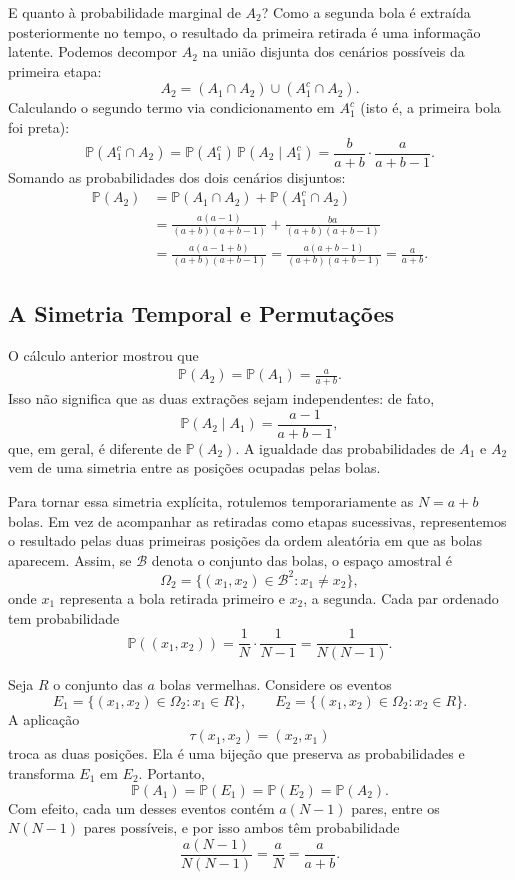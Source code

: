 \documentclass[12pt,portuguese]{article}
\theoremstyle{definition}
\begin{document}
E quanto à probabilidade marginal de \(A_2\)? Como a segunda bola é extraída posteriormente no tempo, o resultado da primeira retirada é uma informação latente. Podemos decompor \(A_2\) na união disjunta dos cenários possíveis da primeira etapa:
\[
  A_2 = (A_1 \cap A_2) \cup (A_1^c \cap A_2).
\]
Calculando o segundo termo via condicionamento em \(A_1^c\) (isto é, a primeira bola foi preta):
\[
  \mathbb{P}(A_1^c \cap A_2) = \mathbb{P}(A_1^c)\,\mathbb{P}(A_2 \mid A_1^c) = \frac{b}{a+b} \cdot \frac{a}{a+b-1}.
\]
Somando as probabilidades dos dois cenários disjuntos:
\begin{equation}\label{eq:urna-segunda-bola}
  \begin{aligned}
    \mathbb{P}(A_2) &= \mathbb{P}(A_1 \cap A_2) + \mathbb{P}(A_1^c \cap A_2) \\
    &= \frac{a(a-1)}{(a+b)(a+b-1)} + \frac{ba}{(a+b)(a+b-1)} \\
    &= \frac{a(a - 1 + b)}{(a+b)(a+b-1)} = \frac{a(a+b-1)}{(a+b)(a+b-1)} = \frac{a}{a+b}.
  \end{aligned}
\end{equation}

\subsection{A Simetria Temporal e Permutações}

O cálculo anterior mostrou que
\begin{align*}
  \mathbb{P}(A_2)=\mathbb{P}(A_1)=\frac{a}{a+b}.
\end{align*}
Isso não significa que as duas extrações sejam independentes: de fato,
\[
  \mathbb{P}(A_2\mid A_1)=\frac{a-1}{a+b-1},
\]
que, em geral, é diferente de \(\mathbb{P}(A_2)\). A igualdade das probabilidades 
de $A_1$ e $A_2$ vem de uma simetria entre as posições ocupadas pelas bolas.

Para tornar essa simetria explícita, rotulemos temporariamente as \(N=a+b\) bolas. Em vez de acompanhar as retiradas como etapas sucessivas, representemos o resultado pelas duas primeiras posições da ordem aleatória em que as bolas aparecem. Assim, se \(\mathcal{B}\) denota o conjunto das bolas, o espaço amostral é
\[
  \Omega_2=\{(x_1,x_2)\in\mathcal{B}^2:x_1\neq x_2\},
\]
onde \(x_1\) representa a bola retirada primeiro e \(x_2\), a segunda. Cada par ordenado tem probabilidade
\[
  \mathbb{P}((x_1,x_2))
  =\frac{1}{N}\cdot\frac{1}{N-1}
  =\frac{1}{N(N-1)}.
\]

Seja \(R\) o conjunto das \(a\) bolas vermelhas. Considere os eventos
\[
  E_1=\{(x_1,x_2)\in\Omega_2:x_1\in R\},
  \qquad
  E_2=\{(x_1,x_2)\in\Omega_2:x_2\in R\}.
\]
A aplicação
\[
  \tau(x_1,x_2)=(x_2,x_1)
\]
troca as duas posições. Ela é uma bijeção que preserva as probabilidades e transforma \(E_1\) em \(E_2\). Portanto,
\[
  \mathbb{P}(A_1)=\mathbb{P}(E_1)
  =\mathbb{P}(E_2)=\mathbb{P}(A_2).
\]
Com efeito, cada um desses eventos contém \(a(N-1)\) pares, entre os \(N(N-1)\) pares possíveis, e por isso ambos têm probabilidade
\[
  \frac{a(N-1)}{N(N-1)}
  =\frac{a}{N}
  =\frac{a}{a+b}.
\]
\end{document}
